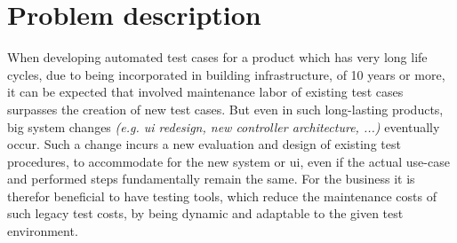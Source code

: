 \documentclass[Bachelor, BIC, english, fhCitStyle, IEEE]{BASE/twbook} %
\begin{document}
\chapter{Problem description}
When developing automated test cases for a product which has very long life cycles, due to being incorporated in building infrastructure, of 10 years or more, it can be expected that involved maintenance labor of existing test cases surpasses the creation of new test cases. But even in such long-lasting products, big system changes \textit{(e.g. \ac{ui} redesign, new controller architecture, ...)} eventually occur. Such a change incurs a new evaluation and design of existing test procedures, to accommodate for the new system or \ac{ui}, even if the actual use-case and performed steps fundamentally remain the same.
For the business it is therefor beneficial to have testing tools, which reduce the maintenance costs of such legacy test costs, by being dynamic and adaptable to the given test environment.\\
\end{document}
